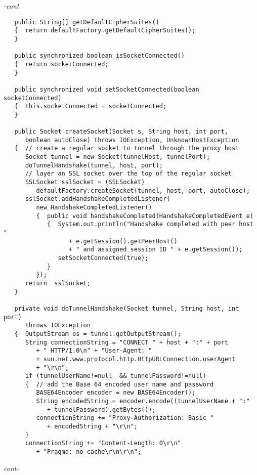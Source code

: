 \begin{figure*}\begin{program}\emph{-cont}\begin{verbatim}
   public String[] getDefaultCipherSuites()
   {  return defaultFactory.getDefaultCipherSuites();
   }

   public synchronized boolean isSocketConnected()
   {  return socketConnected;
   }

   public synchronized void setSocketConnected(boolean socketConnected)
   {  this.socketConnected = socketConnected;
   }

   public Socket createSocket(Socket s, String host, int port,
      boolean autoClose) throws IOException, UnknownHostException
   {  // create a regular socket to tunnel through the proxy host
      Socket tunnel = new Socket(tunnelHost, tunnelPort);
      doTunnelHandshake(tunnel, host, port);
      // layer an SSL socket over the top of the regular socket
      SSLSocket sslSocket = (SSLSocket)
         defaultFactory.createSocket(tunnel, host, port, autoClose);
      sslSocket.addHandshakeCompletedListener(
         new HandshakeCompletedListener()
         {  public void handshakeCompleted(HandshakeCompletedEvent e)
            {  System.out.println("Handshake completed with peer host "
                  + e.getSession().getPeerHost()
                  + " and assigned session ID " + e.getSession());
               setSocketConnected(true);
            }
         });
      return  sslSocket;
   }

   private void doTunnelHandshake(Socket tunnel, String host, int port)
      throws IOException
   {  OutputStream os = tunnel.getOutputStream();
      String connectionString = "CONNECT " + host + ":" + port
         + " HTTP/1.0\n" + "User-Agent: "
         + sun.net.www.protocol.http.HttpURLConnection.userAgent
         + "\r\n";
      if (tunnelUserName!=null  && tunnelPassword!=null)
      {  // add the Base 64 encoded user name and password
         BASE64Encoder encoder = new BASE64Encoder();
         String encodedString = encoder.encode((tunnelUserName + ":"
            + tunnelPassword).getBytes());
         connectionString += "Proxy-Authorization: Basic "
            + encodedString + "\r\n";
      }
      connectionString += "Content-Length: 0\r\n"
         + "Pragma: no-cache\r\n\r\n";
\end{verbatim}\hfill \emph{cont-}\end{program}\end{figure*}%
